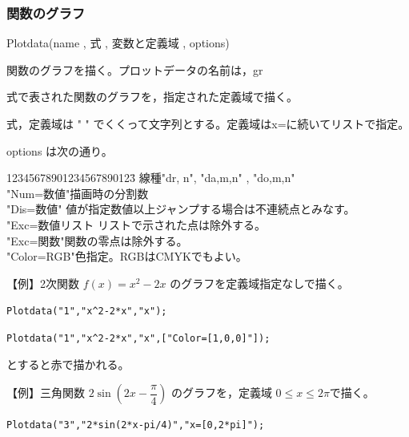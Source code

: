 \documentclass[papersize,a4paper,10pt,uplatex]{jsarticle}
\begin{document}
\subsubsection{関数のグラフ}
\begin{description}

\vspace{\baselineskip}
\hypertarget{plotdata}{}
\item[関数]Plotdata(name , 式 , 変数と定義域 , options)
\item[機能]関数のグラフを描く。プロットデータの名前は，gr
\item[説明]式で表された関数のグラフを，指定された定義域で描く。

式，定義域は " " でくくって文字列とする。定義域はx=に続いてリストで指定。

options は次の通り。
\begin{tabbing}
12345678901234567890123\=\kill
線種\>"dr, n", "da,m,n" , "do,m,n"\\
"Num=数値"\>描画時の分割数\\
"Dis=数値" \>値が指定数値以上ジャンプする場合は不連続点とみなす。\\
"Exc=数値リスト \>リストで示された点は除外する。\\
"Exc=関数"\>関数の零点は除外する。\\
"Color=RGB"\>色指定。RGBはCMYKでもよい。
\end{tabbing}

【例】2次関数 $f(x)=x^2-2x$ のグラフを定義域指定なしで描く。

\hspace{10mm}\verb|Plotdata("1","x^2-2*x","x");|

\vspace{\baselineskip}
\hspace{20mm} \scalebox{0.8}{}

 \verb|Plotdata("1","x^2-2*x","x",["Color=[1,0,0]"]);|

とすると赤で描かれる。

\vspace{\baselineskip}
【例】三角関数 $2\sin \left(2x-\dfrac{\pi}{4} \right)$ のグラフを，定義域 $0 \leq x \leq 2 \pi$で描く。

\hspace{10mm} \verb|Plotdata("3","2*sin(2*x-pi/4)","x=[0,2*pi]");|

\vspace{\baselineskip}
\hspace{20mm} 


\end{description}
\end{document}
